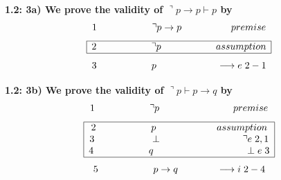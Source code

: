 \documentclass[a4paper]{article}
\begin{document}
\textbf{{\large\hspace{1 cm} 1.2: 3a) We prove the validity of $\urcorner p \rightarrow p \vdash p$ by}}
{\large $$1 \hspace{2 cm} \urcorner p \rightarrow p \hspace{1.8 cm} premise$$ 
$$\begin{array}{|c|}
\hline 
\textcolor{black}{2 \hspace{2 cm} \urcorner p \hspace{2 cm} assumption}\\
\hline
\end{array}$$ $$3 \hspace{2 cm}  p \hspace{2.2 cm} \longrightarrow e\hspace{0.1 cm} 2-1$$}

\newpage

\textbf{{\large\hspace{1 cm} 1.2: 3b) We prove the validity of $\urcorner p \vdash p \rightarrow q$ by}}
{\large $$1 \hspace{2 cm} \urcorner p \hspace{2.7 cm} premise$$ 
$$\begin{array}{|c|}
\hline 
\textcolor{black}{2 \hspace{2 cm} p \hspace{2.2 cm} assumption}\\

\textcolor{black}{3 \hspace{2 cm} \perp \hspace{3 cm} \urcorner e \hspace{0.1 cm} 2,1}\\

\textcolor{black}{4 \hspace{2 cm} q \hspace{3.3 cm} \perp e \hspace{0.1 cm} 3}\\
\hline
\end{array}$$ $$5 \hspace{2 cm} p \rightarrow q \hspace{1.4 cm} \longrightarrow i \hspace{0.1 cm} 2-4$$}\\
\end{document}
